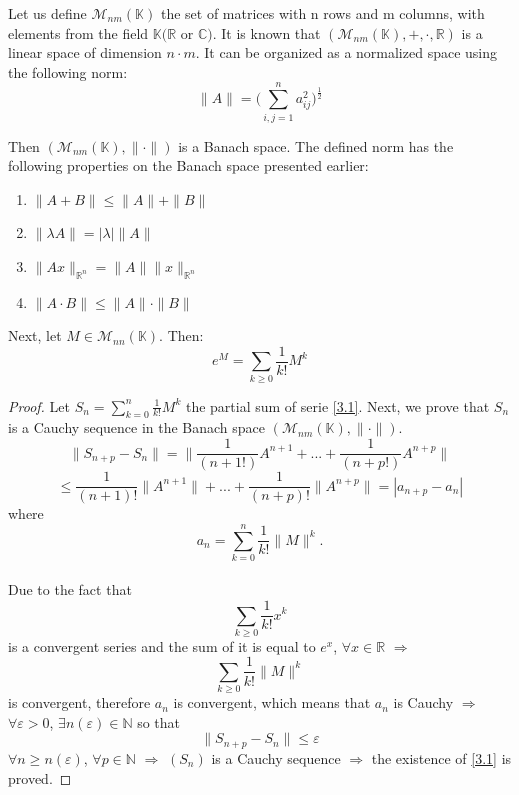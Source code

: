 \documentclass[a4paper,11pt]{report}
\newcommand{\R}{\mathbb{R}}
\begin{document}
Let us define $\mathcal{M}_{nm}(\mathbb{K})$ the set of matrices with n rows and m columns, with elements from the field $\mathbb{K} (\R$ or $\mathbb{C})$. It is known that $(\mathcal{M}_{nm}(\mathbb{K}), +, \cdot, \R)$ is a linear space of dimension $n\cdot m$. It can be organized as a normalized space using the following norm:
\begin{equation*}
 \rVert A \rVert = \bigg( \sum_{i,j=1}^{n} a_{ij}^{2} \bigg)^\frac{1}{2}
\end{equation*}

Then $(\mathcal{M}_{nm}(\mathbb{K}), \rVert \cdot \rVert)$ is a Banach space. The defined norm has the following properties on the Banach space presented earlier:
\begin{enumerate}
  \item $\rVert A+B \rVert \leq \rVert A \rVert + \rVert B \rVert$
  \item $\rVert \lambda A \rVert = |\lambda|\rVert A \rVert$
  \item $\rVert Ax\rVert_{\R ^{n}} = \rVert A \rVert \rVert x \rVert _{\R ^{n}}$
  \item $\rVert A \cdot B \rVert \leq \rVert A \rVert \cdot \rVert B \rVert$
 \end{enumerate}
Next, let $M\in\mathcal{M}_{nn}(\mathbb{K})$. Then:
\begin{equation}
 e^{M}=\sum_{k\geq0} \frac{1}{k!} M^{k} \label{3.1} \tag{3.1}
\end{equation}
\begin{proof}
 Let $S_{n}=\sum_{k=0}^{n}\frac{1}{k!}M^{k}$ the partial sum of serie \eqref{3.1}. Next, we prove that $S_{n}$ is a Cauchy sequence in the Banach space $(\mathcal{M}_{nm}(\mathbb{K}), \rVert \cdot \rVert)$. 
 \begin{equation*}
  \rVert S_{n+p}-S_{n}\rVert=\rVert\frac{1}{(n+1!)} A^{n+1}+...+\frac{1}{(n+p!)} A^{n+p}\rVert
  \end{equation*}
  \begin{equation*}
   \leq \frac{1}{(n+1)!}\rVert A^{n+1}\rVert+...+\frac{1}{(n+p)!}\rVert A^{n+p}\rVert=|a_{n+p}-a_{n}|
  \end{equation*}
where $$a_{n}=\sum_{k=0}^{n}\frac{1}{k!}\rVert M \rVert ^{k}.$$\\
Due to the fact that $$\sum_{k\geq 0} \frac{1}{k!}x^{k}$$ is a convergent series and the sum of it is equal to $e^{x}$, $\forall x\in \R$ $\Rightarrow$ $$\sum_{k\geq 0}\frac{1}{k!}\rVert M \rVert ^{k}$$ is convergent, therefore $a_{n}$ is convergent, which means that $a_{n}$ is Cauchy $\Rightarrow$ $\forall \varepsilon > 0$,  $\exists n(\varepsilon) \in \mathbb{N}$ so that $$\rVert S_{n+p} - S_{n} \rVert \leq \varepsilon$$ $\forall n\geq n(\varepsilon)$, $ \forall p\in \mathbb{N}$ $\Rightarrow$ $(S_{n})$ is a Cauchy sequence $\Rightarrow$ the existence of \eqref{3.1} is proved.


\end{proof}
\end{document}
